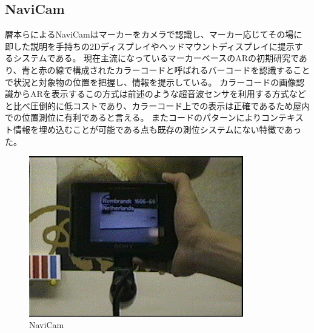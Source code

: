 \subsection{NaviCam}
暦本らによるNaviCam\cite{10.1145/215585.215639}はマーカーをカメラで認識し、マーカー応じてその場に即した説明を手持ちの2Dディスプレイやヘッドマウントディスプレイに提示するシステムである。
現在主流になっているマーカーベースのARの初期研究であり、青と赤の線で構成されたカラーコードと呼ばれるバーコードを認識することで状況と対象物の位置を把握し、情報を提示している。
カラーコードの画像認識からARを表示するこの方式は前述のような超音波センサを利用する方式などと比べ圧倒的に低コストであり、カラーコード上での表示は正確であるため屋内での位置測位に有利であると言える。
またコードのパターンによりコンテキスト情報を埋め込むことが可能である点も既存の測位システムにない特徴であった。

\begin{figure}[h]
  \centering
  \includegraphics[height=70mm]{images/NaviCam.png}
  \caption{NaviCam} \label{fig:NaviCam}
\end{figure}


